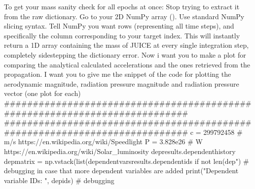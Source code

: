 {}
\markdownRendererSectionEnd \markdownRendererSectionBegin
{}\markdownRendererInterblockSeparator
{}To get your mass sanity check for all epochs at once:\markdownRendererInterblockSeparator
{}\markdownRendererOlBegin
{}Stop trying to extract it from the raw  dictionary.\markdownRendererOlItemEnd 
{}Go to your 2D NumPy array ().\markdownRendererOlItemEnd 
{}Use standard NumPy slicing syntax. Tell NumPy you want  rows (representing all time steps), and specifically the column corresponding to your target index.\markdownRendererOlItemEnd 
\markdownRendererOlEnd \markdownRendererInterblockSeparator
{}This will instantly return a 1D array containing the mass of JUICE at every single integration step, completely sidestepping the dictionary error.\markdownRendererInterblockSeparator
{}\markdownRendererThematicBreak{}\markdownRendererInterblockSeparator
{}
\markdownRendererSectionEnd 
\markdownRendererSectionEnd \markdownRendererSectionBegin
{}\markdownRendererInterblockSeparator
{}Now i want you to make a plot for comparing the analytical calculated accelerations and the ones retrieved from the propagation. I want you to give me the snippet of the code for plotting the aerodynamic magnitude, radiation pressure magnitude and radiation pressure vector (one plot for each)\markdownRendererInterblockSeparator
{}###########################################################################\markdownRendererInterblockSeparator
{}
\markdownRendererSectionEnd 
\markdownRendererSectionEnd \markdownRendererSectionBegin
{}\markdownRendererInterblockSeparator
{}########################################################################### c = 299792458 # m/s https://en.wikipedia.org/wiki/Speedlight P = 3.828e26 # W https://en.wikipedia.org/wiki/Solar_luminosity\markdownRendererInterblockSeparator
{}
\markdownRendererSectionEnd \markdownRendererSectionBegin
{}\markdownRendererInterblockSeparator
{}depresults.dependenthistory depmatrix = np.vstack(list(dependentvarsresults.dependentids if not len(dep") # debugging in case that more dependent variables are added print("Dependent variable IDs: ", depids) # debugging\markdownRendererInterblockSeparator
